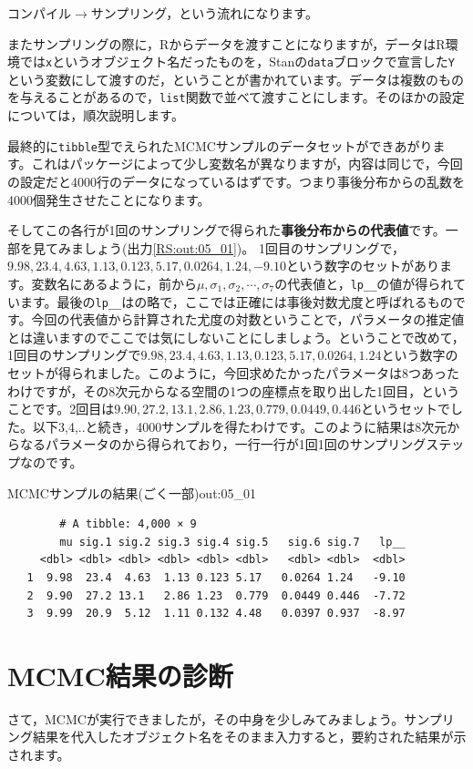 \documentclass{ltjsbook}
\begin{document}
コンパイル$\to$サンプリング，という流れになります。

またサンプリングの際に，Rからデータを渡すことになりますが，データはR環境では\texttt{x}というオブジェクト名だったものを，Stanの\texttt{data}ブロックで宣言した\texttt{Y}という変数にして渡すのだ，ということが書かれています。データは複数のものを与えることがあるので，\texttt{list}関数で並べて渡すことにします。そのほかの設定については，順次説明します。

最終的に\verb|tibble|型でえられたMCMCサンプルのデータセットができあがります。これはパッケージによって少し変数名が異なりますが，内容は同じで，今回の設定だと4000行のデータになっているはずです。つまり事後分布からの乱数を4000個発生させたことになります。

そしてこの各行が1回のサンプリングで得られた\textbf{事後分布からの代表値}です。一部を見てみましょう(出力\ref{RS:out:05_01})。
1回目のサンプリングで，$9.98,23.4,4.63,1.13,0.123,5.17,0.0264,1.24,-9.10$という数字のセットがあります。変数名にあるように，前から$\mu, \sigma_1,\sigma_2,\cdots,\sigma_7$の代表値と，\verb|lp__|の値が得られています。最後の\verb|lp__|はの略で，ここでは正確には事後対数尤度と呼ばれるものです。今回の代表値から計算された尤度の対数ということで，パラメータの推定値とは違いますのでここでは気にしないことにしましょう。ということで改めて，1回目のサンプリングで$9.98,23.4,4.63,1.13,0.123,5.17,0.0264,1.24$という数字のセットが得られました。このように，今回求めたかったパラメータは8つあったわけですが，その8次元からなる空間の1つの座標点を取り出した1回目，ということです。2回目は$9.90,27.2,13.1,2.86,1.23,0.779,0.0449,0.446$というセットでした。以下3,4,..と続き，4000サンプルを得たわけです。このように結果は8次元からなるパラメータのから得られており，一行一行が1回1回のサンプリングステップなのです。

\begin{Rscreen}{MCMCサンプルの結果(ごく一部)}{out:05_01}
	\begin{verbatim}
        # A tibble: 4,000 × 9
        mu sig.1 sig.2 sig.3 sig.4 sig.5   sig.6 sig.7   lp__
     <dbl> <dbl> <dbl> <dbl> <dbl> <dbl>   <dbl> <dbl>  <dbl>
   1  9.98  23.4  4.63  1.13 0.123 5.17   0.0264 1.24   -9.10
   2  9.90  27.2 13.1   2.86 1.23  0.779  0.0449 0.446  -7.72
   3  9.99  20.9  5.12  1.11 0.132 4.48   0.0397 0.937  -8.97
\end{verbatim}
\end{Rscreen}

\section{MCMC結果の診断}
さて，MCMCが実行できましたが，その中身を少しみてみましょう。サンプリング結果を代入したオブジェクト名をそのまま入力すると，要約された結果が示されます。
\end{document}
